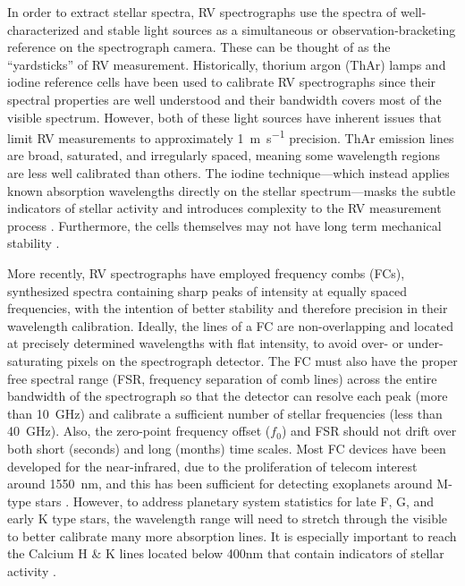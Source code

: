 In order to extract stellar spectra, RV spectrographs use the spectra of well-characterized and stable light sources as a simultaneous or observation-bracketing reference on the spectrograph camera. These can be thought of as the ``yardsticks'' of RV measurement. Historically, thorium argon (ThAr) lamps and iodine reference cells have been used to calibrate RV spectrographs since their spectral properties are well understood and their bandwidth covers most of the visible spectrum. However, both of these light sources have inherent issues that limit RV measurements to approximately \SI{1}{\meter\per\second} precision. ThAr emission lines are broad, saturated, and irregularly spaced, meaning some wavelength regions are less well calibrated than others. The iodine technique---which instead applies known absorption wavelengths directly on the stellar spectrum---masks the subtle indicators of stellar activity and introduces complexity to the RV measurement process \citep{spronck_fiber_2015}. Furthermore, the cells themselves may not have long term mechanical stability \citep{fischer_twenty-five_2014}.

More recently, RV spectrographs have employed frequency combs (FCs), synthesized spectra containing sharp peaks of intensity at equally spaced frequencies, with the intention of better stability and therefore precision in their wavelength calibration. Ideally, the lines of a FC are non-overlapping and located at precisely determined wavelengths with flat intensity, to avoid over- or under-saturating pixels on the spectrograph detector. The FC must also have the proper free spectral range (FSR, frequency separation of comb lines) across the entire bandwidth of the spectrograph so that the detector can resolve each peak (more than \SI{10}{\giga\hertz}) and calibrate a sufficient number of stellar frequencies (less than \SI{40}{\giga\hertz}). Also, the zero-point frequency offset ($f_0$) and FSR should not drift over both short (seconds) and long (months) time scales. Most FC devices have been developed for the near-infrared, due to the proliferation of telecom interest around \SI{1550}{\nano\meter}, and this has been sufficient for detecting exoplanets around M-type stars \citep{fischer_state_2016}. However, to address planetary system statistics for late F, G, and early K type stars, the wavelength range will need to stretch through the visible to better calibrate many more absorption lines. It is especially important to reach the Calcium H \& K lines located below 400\si{\nano\meter} that contain indicators of stellar activity \citep{isaacson_chromospheric_2010, lovis_harps_2011}.

